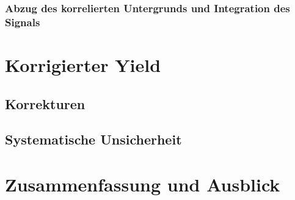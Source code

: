 \documentclass[11pt]{article}
\begin{document}
\subsubsection{Abzug des korrelierten Untergrunds und Integration des Signals} \label{s3s4s4}

\section{Korrigierter Yield} \label{s4}

\subsection{Korrekturen} \label{s4s1}

\subsection{Systematische Unsicherheit} \label{s4s2}

\section{Zusammenfassung und Ausblick} \label{s5}

\newpage
 

\end{document}
